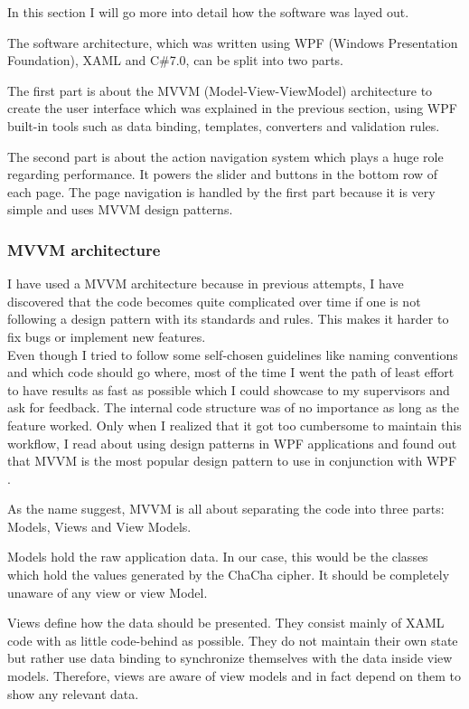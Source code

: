 In this section I will go more into detail how the software was layed out.

The software architecture, which was written using WPF (Windows Presentation Foundation), XAML and C\#7.0, can be split into two parts.

The first part is about the MVVM (Model-View-ViewModel) architecture to create the user interface which was explained in the previous section, using WPF built-in tools such as data binding, templates, converters and validation rules.

The second part is about the action navigation system which plays a huge role regarding performance. It powers the slider and buttons in the bottom row of each page. The page navigation is handled by the first part because it is very simple and uses MVVM design patterns.

\subsubsection{MVVM architecture}

I have used a MVVM architecture because in previous attempts, I have discovered that the code becomes quite complicated over time if one is not following a design pattern with its standards and rules. This makes it harder to fix bugs or implement new features. \\
Even though I tried to follow some self-chosen guidelines like naming conventions and which code should go where, most of the time I went the path of least effort to have results as fast as possible which I could showcase to my supervisors and ask for feedback. The internal code structure was of no importance as long as the feature worked. Only when I realized that it got too cumbersome to maintain this workflow, I read about using design patterns in WPF applications and found out that MVVM is the most popular design pattern to use in conjunction with WPF \cite{mvvm-wpf}.

As the name suggest, MVVM is all about separating the code into three parts: Models, Views and View Models.

Models hold the raw application data. In our case, this would be the classes which hold the values generated by the ChaCha cipher. It should be completely unaware of any view or view Model.

Views define how the data should be presented. They consist mainly of XAML code with as little code-behind as possible. They do not maintain their own state but rather use data binding to synchronize themselves with the data inside view models. Therefore, views are aware of view models and in fact depend on them to show any relevant data.

